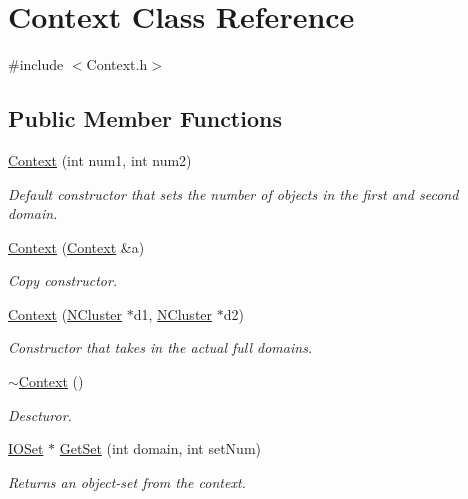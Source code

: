\hypertarget{class_context}{
\section{Context Class Reference}
\label{class_context}
}


{\ttfamily \#include $<$Context.h$>$}

\subsection*{Public Member Functions}
\begin{DoxyCompactItemize}
\item 
\hyperlink{class_context_a7c09cf1cce283bf24fed475e7084c294}{Context} (int num1, int num2)
\begin{DoxyCompactList}\small\item\em Default constructor that sets the number of objects in the first and second domain. \item\end{DoxyCompactList}\item 
\hyperlink{class_context_ac0423f54b36186488e04d7723c52fee4}{Context} (\hyperlink{class_context}{Context} \&a)
\begin{DoxyCompactList}\small\item\em Copy constructor. \item\end{DoxyCompactList}\item 
\hyperlink{class_context_ae66f36043dcffe09e73765eed28eb782}{Context} (\hyperlink{class_n_cluster}{NCluster} $\ast$d1, \hyperlink{class_n_cluster}{NCluster} $\ast$d2)
\begin{DoxyCompactList}\small\item\em Constructor that takes in the actual full domains. \item\end{DoxyCompactList}\item 
\hyperlink{class_context_a2d34e4556448e40693f61d15e091b604}{$\sim$Context} ()
\begin{DoxyCompactList}\small\item\em Descturor. \item\end{DoxyCompactList}\item 
\hyperlink{class_i_o_set}{IOSet} $\ast$ \hyperlink{class_context_adeeca59fd329ad829de527c37489e7b8}{GetSet} (int domain, int setNum)
\begin{DoxyCompactList}\small\item\em Returns an object-\/set from the context. \item\end{DoxyCompactList}\item 

\end{DoxyCompactItemize}
